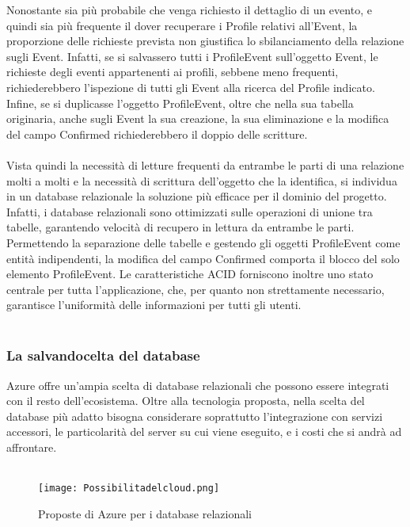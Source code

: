 Nonostante sia più probabile che venga richiesto il dettaglio di un evento, e quindi sia più frequente il dover recuperare i Profile relativi all’Event, 
la proporzione delle richieste prevista non giustifica lo sbilanciamento della relazione sugli Event.
Infatti, se si salvassero tutti i ProfileEvent sull’oggetto Event, le richieste degli eventi appartenenti ai profili, sebbene meno frequenti, 
richiederebbero l’ispezione di tutti gli Event alla ricerca del Profile indicato. 
Infine, se si duplicasse l’oggetto ProfileEvent, oltre che nella sua tabella originaria, anche sugli Event la sua creazione, 
la sua eliminazione e la modifica del campo Confirmed richiederebbero il doppio delle scritture.\\
\\
Vista quindi la necessità di letture frequenti da entrambe le parti di una relazione molti a molti e la necessità di scrittura dell’oggetto che la identifica, 
si individua in un database relazionale la soluzione più efficace per il dominio del progetto. 
Infatti, i database relazionali sono ottimizzati sulle operazioni di unione tra tabelle, garantendo velocità di recupero in lettura da entrambe le parti. 
Permettendo la separazione delle tabelle e gestendo gli oggetti ProfileEvent come entità indipendenti, 
la modifica del campo Confirmed comporta il blocco del solo elemento ProfileEvent. 
Le caratteristiche ACID forniscono inoltre uno stato centrale per tutta l’applicazione, che, 
per quanto non strettamente necessario, garantisce l’uniformità delle informazioni per tutti gli utenti.\\
\\

\clearpage
\subsubsection{La salvandocelta del database}

Azure offre un’ampia scelta di database relazionali che possono essere integrati con il resto dell’ecosistema. 
Oltre alla tecnologia proposta, nella scelta del database più adatto bisogna considerare soprattutto l’integrazione con servizi accessori, 
le particolarità del server su cui viene eseguito, e i costi che si andrà ad affrontare.\\
\\
\begin{figure}[h!]
    \centering
    \texttt{[image: Possibilitadelcloud.png]}
    \caption{Proposte di Azure per i database relazionali}
\end{figure}	


